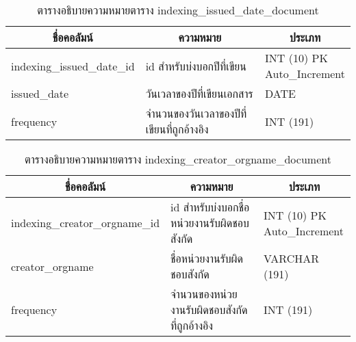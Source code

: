 \begin{table}[H]
\caption{ตารางอธิบายความหมายตาราง indexing\_issued\_date\_document}\label{tbl:indexingissueddatedocument}        
\begin{tabular}{|l|l|l|}
\hline
\multicolumn{1}{|c|}{ชื่อคอลัมน์} & \multicolumn{1}{c|}{ความหมาย}             & \multicolumn{1}{c|}{ประเภท}                                                   \\ \hline
indexing\_issued\_date\_id        & id สำหรับบ่งบอกปีที่เขียน                 & \makecell[l]{INT   (10) PK\\Auto\_Increment} \\ \hline
issued\_date                      & วันเวลาของปีที่เขียนเอกสาร                & DATE                                                                          \\ \hline
frequency                         & จำนวนของวันเวลาของปีที่เขียนที่ถูกอ้างอิง & INT (191)                                                                     \\ \hline
\end{tabular}
\end{table}

\begin{table}[H]
\caption{ตารางอธิบายความหมายตาราง indexing\_creator\_orgname\_document}\label{tbl:indexingcreatororgnamedocument}        
\begin{tabular}{|l|l|l|}
\hline
\multicolumn{1}{|c|}{ชื่อคอลัมน์} & \multicolumn{1}{c|}{ความหมาย}                & \multicolumn{1}{c|}{ประเภท}                                                   \\ \hline
indexing\_creator\_orgname\_id    & id สำหรับบ่งบอกชื่อหน่วยงานรับผิดชอบสังกัด   & \makecell[l]{INT   (10) PK\\Auto\_Increment} \\ \hline
creator\_orgname                  & ชื่อหน่วยงานรับผิดชอบสังกัด                  & VARCHAR   (191)                                                               \\ \hline
frequency                         & จำนวนของหน่วยงานรับผิดชอบสังกัดที่ถูกอ้างอิง & INT (191)                                                                     \\ \hline
\end{tabular}
\end{table}

